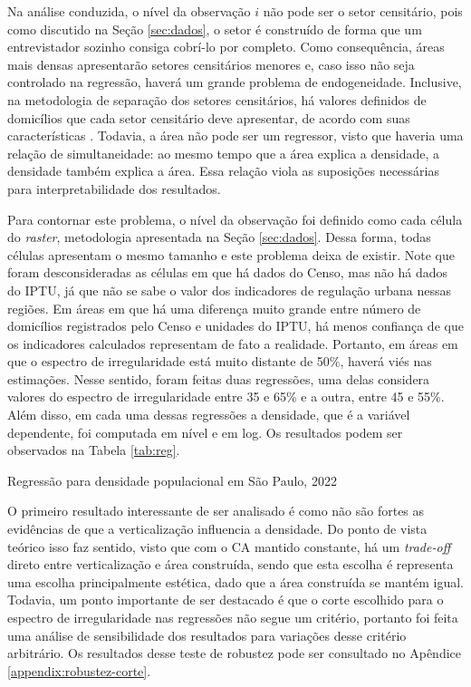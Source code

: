 Na análise conduzida, o nível da observação $i$ não pode ser o setor censitário, pois como discutido na Seção \ref{sec:dados}, o setor é construído de forma que um entrevistador sozinho consiga cobrí-lo por completo. Como consequência, áreas mais densas apresentarão setores censitários menores e, caso isso não seja controlado na regressão, haverá um grande problema de endogeneidade. Inclusive, na metodologia de separação dos setores censitários, há valores definidos de domicílios que cada setor censitário deve apresentar, de acordo com suas características \cite{IBGE2024}. Todavia, a área não pode ser um regressor, visto que haveria uma relação de simultaneidade: ao mesmo tempo que a área explica a densidade, a densidade também explica a área. Essa relação viola as suposições necessárias para interpretabilidade dos resultados.

Para contornar este problema, o nível da observação foi definido como cada célula do \textit{raster}, metodologia apresentada na Seção \ref{sec:dados}. Dessa forma, todas células apresentam o mesmo tamanho e este problema deixa de existir. Note que foram desconsideradas as células em que há dados do Censo, mas não há dados do IPTU, já que não se sabe o valor dos indicadores de regulação urbana nessas regiões. Em áreas em que há uma diferença muito grande entre número de domicílios registrados pelo Censo e unidades do IPTU, há menos confiança de que os indicadores calculados representam de fato a realidade. Portanto, em áreas em que o espectro de irregularidade está muito distante de 50\%, haverá viés nas estimações. Nesse sentido, foram feitas duas regressões, uma delas considera valores do espectro de irregularidade entre 35 e 65\% e a outra, entre 45 e 55\%. Além disso, em cada uma dessas regressões a densidade, que é a variável dependente, foi computada em nível e em log. Os resultados podem ser observados na Tabela \ref{tab:reg}. 

\begin{table}[h]
    \caption{Regressão para densidade populacional em São Paulo, 2022}
    
    \label{tab:reg}
    \addtocounter{table}{-1}
\end{table}

O primeiro resultado interessante de ser analisado é como não são fortes as evidências de que a verticalização influencia a densidade. Do ponto de vista teórico isso faz sentido, visto que com o CA mantido constante, há um \textit{trade-off} direto entre verticalização e área construída, sendo que esta escolha é representa uma escolha principalmente estética, dado que a área construída se mantém igual. Todavia, um ponto importante de ser destacado é que o corte escolhido para o espectro de irregularidade nas regressões não segue um critério, portanto foi feita uma análise de sensibilidade dos resultados para variações desse critério arbitrário. Os resultados desse teste de robustez pode ser consultado no Apêndice \ref{appendix:robustez-corte}.

